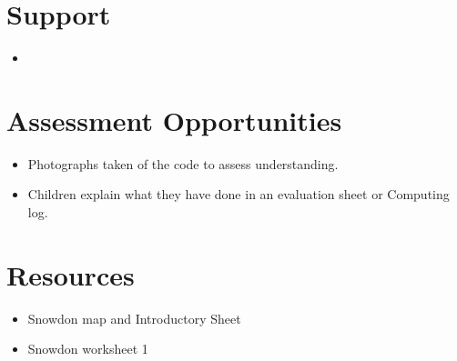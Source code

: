 \documentclass{geocraft-lesson-plan}
\begin{document}
\section*{Support}
\begin{itemize}
\item 
\end{itemize}

\section*{Assessment Opportunities}
\begin{itemize}
\item Photographs taken of the code to assess understanding. 
\item Children explain what they have done in an evaluation sheet or Computing log.  
\end{itemize}



\section*{Resources}
\begin{itemize}
\item Snowdon map and Introductory Sheet
\item Snowdon worksheet 1
\end{itemize}

\end{document}
